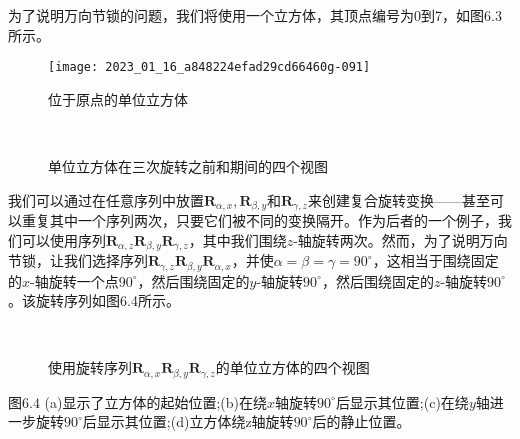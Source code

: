 为了说明万向节锁的问题，我们将使用一个立方体，其顶点编号为0到7，如图6.3所示。
\begin{figure}[h!]
    \centering
    \texttt{[image: 2023\_01\_16\_a848224efad29cd66460g-091]}
    \caption[short]{位于原点的单位立方体}
\end{figure}

\begin{figure}[h!]
    \centering
    \\
    \caption[short]{单位立方体在三次旋转之前和期间的四个视图}
\end{figure}

我们可以通过在任意序列中放置$\mathbf{R}_{\alpha, x}, \mathbf{R}_{\beta, y}$和$\mathbf{R}_{\gamma, z}$来创建复合旋转变换——甚至可以重复其中一个序列两次，只要它们被不同的变换隔开。作为后者的一个例子，我们可以使用序列$\mathbf{R}_{\alpha, z} \mathbf{R}_{\beta, y} \mathbf{R}_{\gamma, z}$，其中我们围绕$z$-轴旋转两次。然而，为了说明万向节锁，让我们选择序列$\mathbf{R}_{\gamma, z} \mathbf{R}_{\beta, y} \mathbf{R}_{\alpha, x}$，并使$\alpha=\beta=\gamma=90^{\circ}$，这相当于围绕固定的$x$-轴旋转一个点$90^{\circ}$，然后围绕固定的$y$-轴旋转$90^{\circ}$，然后围绕固定的$z$-轴旋转$90^{\circ}$。该旋转序列如图6.4所示。

\begin{figure}[h!]
    \centering
    \\
    \caption[short]{使用旋转序列$\mathbf{R}_{\alpha, x} \mathbf{R}_{\beta, y} \mathbf{R}_{\gamma, z}$的单位立方体的四个视图}
\end{figure}

图$6.4$ (a)显示了立方体的起始位置;(b)在绕$x$轴旋转$90^{\circ}$后显示其位置;(c)在绕$y$轴进一步旋转$90^{\circ}$后显示其位置;(d)立方体绕z轴旋转$90^{\circ}$后的静止位置。

